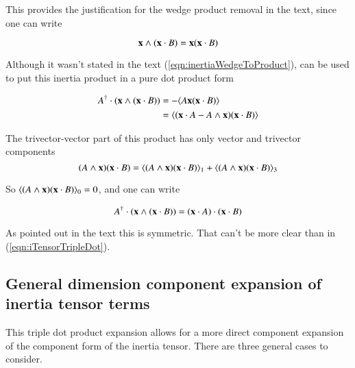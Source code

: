 \documentclass{article}      %
\begin{document}
This provides the justification for the wedge product removal in the text, since
one can write

\begin{equation}
\mathbf{x} \wedge ( \mathbf{x} \cdot B ) = \mathbf{x} ( \mathbf{x} \cdot B )
\end{equation}\label{eqn:inertiaWedgeToProduct}

Although it wasn't stated in the text (\ref{eqn:inertiaWedgeToProduct}), can
be used to put this inertia product in a pure dot product form

\begin{align*}
A^\dagger \cdot (\mathbf{x} \wedge (\mathbf{x} \cdot B) )
&= -\langle {A \mathbf{x}(\mathbf{x}\cdot B)} \rangle \\
&= \langle (\mathbf{x} \cdot A - A \wedge \mathbf{x})(\mathbf{x} \cdot B) \rangle \\
\end{align*}

The trivector-vector part of this product has only vector and trivector components
\[
(A \wedge \mathbf{x})(\mathbf{x} \cdot B) = \langle{ (A \wedge \mathbf{x})(\mathbf{x}\cdot B)}\rangle_1 + \langle{(A \wedge \mathbf{x})(\mathbf{x}\cdot B)}\rangle_3
\]

So $\langle{(A \wedge \mathbf{x})(\mathbf{x}\cdot B)}\rangle_0 = 0$, and one can write

\begin{equation}
A^\dagger \cdot (\mathbf{x} \wedge (\mathbf{x} \cdot B) ) = (\mathbf{x} \cdot A) \cdot (\mathbf{x} \cdot B)
\end{equation}\label{eqn:iTensorTripleDot}

As pointed out in the text this is symmetric.  That can't be more clear than in (\ref{eqn:iTensorTripleDot}).

\subsection{ General dimension component expansion of inertia tensor terms }

This triple dot product expansion allows for a more direct component expansion of the component form of the inertia tensor.
There are three general cases to consider.
\end{document}
